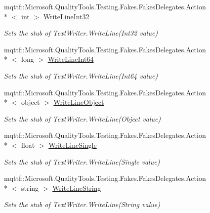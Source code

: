 \begin{DoxyCompactItemize}
mqttf\-::\-Microsoft.\-Quality\-Tools.\-Testing.\-Fakes.\-Fakes\-Delegates.\-Action\\*
$<$ int $>$ \hyperlink{class_system_1_1_i_o_1_1_fakes_1_1_stub_string_writer_a69d3ac1d06350257bf9f1cb74667c573}{Write\-Line\-Int32}
\begin{DoxyCompactList}\small\item\em Sets the stub of Text\-Writer.\-Write\-Line(\-Int32 value)\end{DoxyCompactList}\item 
mqttf\-::\-Microsoft.\-Quality\-Tools.\-Testing.\-Fakes.\-Fakes\-Delegates.\-Action\\*
$<$ long $>$ \hyperlink{class_system_1_1_i_o_1_1_fakes_1_1_stub_string_writer_a27744148770d2f65e06b49a8e32315ca}{Write\-Line\-Int64}
\begin{DoxyCompactList}\small\item\em Sets the stub of Text\-Writer.\-Write\-Line(\-Int64 value)\end{DoxyCompactList}\item 
mqttf\-::\-Microsoft.\-Quality\-Tools.\-Testing.\-Fakes.\-Fakes\-Delegates.\-Action\\*
$<$ object $>$ \hyperlink{class_system_1_1_i_o_1_1_fakes_1_1_stub_string_writer_a6bdb6f902fb3e896f0d79416c2faa012}{Write\-Line\-Object}
\begin{DoxyCompactList}\small\item\em Sets the stub of Text\-Writer.\-Write\-Line(\-Object value)\end{DoxyCompactList}\item 
mqttf\-::\-Microsoft.\-Quality\-Tools.\-Testing.\-Fakes.\-Fakes\-Delegates.\-Action\\*
$<$ float $>$ \hyperlink{class_system_1_1_i_o_1_1_fakes_1_1_stub_string_writer_ade7b74d1fcb743406ec33fb613245aab}{Write\-Line\-Single}
\begin{DoxyCompactList}\small\item\em Sets the stub of Text\-Writer.\-Write\-Line(\-Single value)\end{DoxyCompactList}\item 
mqttf\-::\-Microsoft.\-Quality\-Tools.\-Testing.\-Fakes.\-Fakes\-Delegates.\-Action\\*
$<$ string $>$ \hyperlink{class_system_1_1_i_o_1_1_fakes_1_1_stub_string_writer_a391af2e21ddd03f8c85d593f05008b4b}{Write\-Line\-String}
\begin{DoxyCompactList}\small\item\em Sets the stub of Text\-Writer.\-Write\-Line(\-String value)\end{DoxyCompactList}\item 

\end{DoxyCompactItemize}
